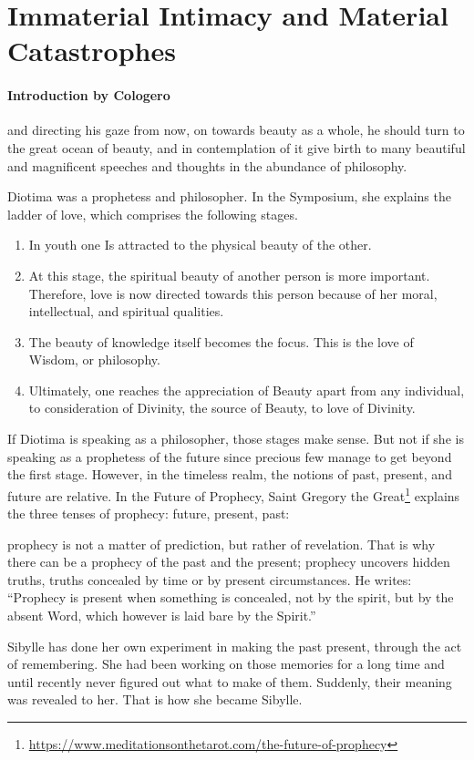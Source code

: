 \section{Immaterial Intimacy and Material Catastrophes}

\paragraph{Introduction by Cologero}

\begin{quotex}
and directing his gaze from now, on towards beauty as a whole, he should turn to the great ocean of beauty, and in contemplation of it give birth to many beautiful and magnificent speeches and thoughts in the abundance of philosophy. 

\end{quotex}
Diotima was a prophetess and philosopher. In the Symposium, she explains the ladder of love, which comprises the following stages.

\begin{enumerate}
\item In youth one Is attracted to the physical beauty of the other. 
\item At this stage, the spiritual beauty of another person is more important. Therefore, love is now directed towards this person because of her moral, intellectual, and spiritual qualities. 
\item The beauty of knowledge itself becomes the focus. This is the love of Wisdom, or philosophy. 
\item Ultimately, one reaches the appreciation of Beauty apart from any individual, to consideration of Divinity, the source of Beauty, to love of Divinity. 
\end{enumerate}
If Diotima is speaking as a philosopher, those stages make sense. But not if she is speaking as a prophetess of the future since precious few manage to get beyond the first stage. However, in the timeless realm, the notions of past, present, and future are relative. In the Future of Prophecy, Saint Gregory the Great\footnote{\url{https://www.meditationsonthetarot.com/the-future-of-prophecy}} explains the three tenses of prophecy: future, present, past:

\begin{quotex}
prophecy is not a matter of prediction, but rather of revelation. That is why there can be a prophecy of the past and the present; prophecy uncovers hidden truths, truths concealed by time or by present circumstances. He writes: “Prophecy is present when something is concealed, not by the spirit, but by the absent Word, which however is laid bare by the Spirit.” 

\end{quotex}
Sibylle has done her own experiment in making the past present, through the act of remembering. She had been working on those memories for a long time and until recently never figured out what to make of them. Suddenly, their meaning was revealed to her. That is how she became Sibylle.

